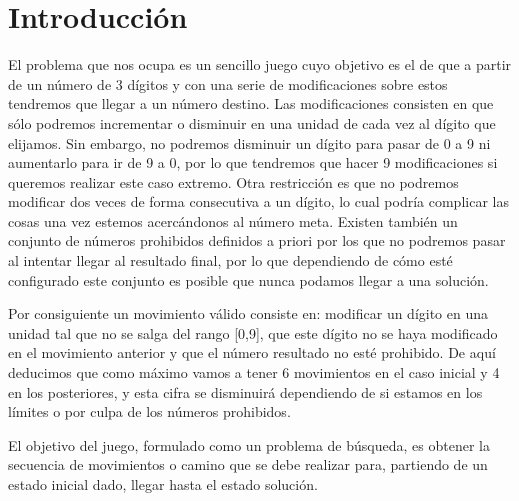 \documentclass[12pt]{article}
\begin{document}
\newpage 
\thispagestyle{empty} %
\tableofcontents 

\newpage
\section{Introducción}
El problema que nos ocupa es un sencillo juego cuyo objetivo es el de que a partir de un número de 3 dígitos y con una serie de modificaciones sobre estos tendremos que llegar a un número destino. Las modificaciones consisten en que sólo podremos incrementar o disminuir en una unidad de cada vez al dígito que elijamos. Sin embargo, no podremos disminuir un dígito para pasar de 0 a 9 ni aumentarlo para ir de 9 a 0, por lo que tendremos que hacer 9 modificaciones si queremos realizar este caso extremo. Otra restricción es que no podremos modificar dos veces de forma consecutiva a un dígito, lo cual podría complicar las cosas una vez estemos acercándonos al número meta. Existen también un conjunto de números prohibidos definidos a priori por los que no podremos pasar al intentar llegar al resultado final, por lo que dependiendo de cómo esté configurado este conjunto es posible que nunca podamos llegar a una solución.

Por consiguiente un movimiento válido consiste en: modificar un dígito en una unidad tal que no se salga del rango [0,9], que este dígito no se haya modificado en el movimiento anterior y que el número resultado no esté prohibido. De aquí deducimos que como máximo vamos a tener 6 movimientos en el caso inicial y 4 en los posteriores, y esta cifra se disminuirá dependiendo de si estamos en los límites o por culpa de los números prohibidos.

El objetivo del juego, formulado como un problema de búsqueda, es obtener la secuencia de movimientos o camino que se debe realizar para, partiendo de un estado inicial dado, llegar hasta el estado solución. 
\end{document}
